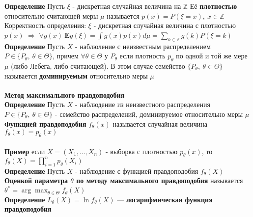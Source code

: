 \documentclass[25pt]{article}
\begin{document}
\textbf{Определение} Пусть $\xi$ - дискретная случайная величина на $\mathbb{Z}$ Её \textbf{плотностью} относительно считающей меры $\mu$ называется $p(x) = P(\xi = x),\ x\in\mathbb{Z}$\\
Корректность определения: $\xi$ - дискретная случайная величина с плотностью $p(x)$ $\Rightarrow$ $\forall g(x)\ \textbf{E}g(\xi) = \int{g(x)p(x)d\mu} = \sum_{k\in\mathbb{Z}}{g(k)P(\xi=k)}$\\
\textbf{Определение} Пусть $X$ - наблюление с неизвестным распределением $P \in \{P_\theta,\ \theta\in\Theta\}$, причем $\forall \theta \in \Theta$ у $P_\theta$ если плотность $p_\theta$ по одной и той же мере $\mu$ (либо Лебега, либо считающей). В этом случае семейство $\{P_\theta,\ \theta \in \Theta\}$ называется \textbf{доминируемым} относительно меры $\mu$\\
 \\ 
\textbf{Метод максимального правдоподобия}
\\
\textbf{Определение} Пусть $X$ - наблюдение из неизвестного распределения $P \in \{P_\theta,\ \theta\in\Theta\}$ - семейство распределений, доминируемое относительно меры $\mu$\\
\textbf{Функцией правдоподобия} $f_\theta(x)$ называется случайная величина $f_\theta(x) = p_\theta(x)$\\
\\
\textbf{Пример} если $X = (X_1,\dots,X_n)$ - выборка с плотностью $p_\theta(x)$, то $f_\theta(X) = \prod_{i=1}^n p_\theta(X_i)$\\
\textbf{Определение} Пусть $X$ - наблюдение с функцией правдоподобия $f_\theta(X)$ \textbf{Оценкой параметра $\theta$ по методу максимального правдоподобия} называется $\theta^* = \arg\max_{\theta\in\Theta}{f_\theta(X)}$\\
\textbf{Определение} $L_\theta(X) = \ln{f_\theta(X)}$ --- \textbf{логарифмическая функция правдоподобия}
\end{document}
